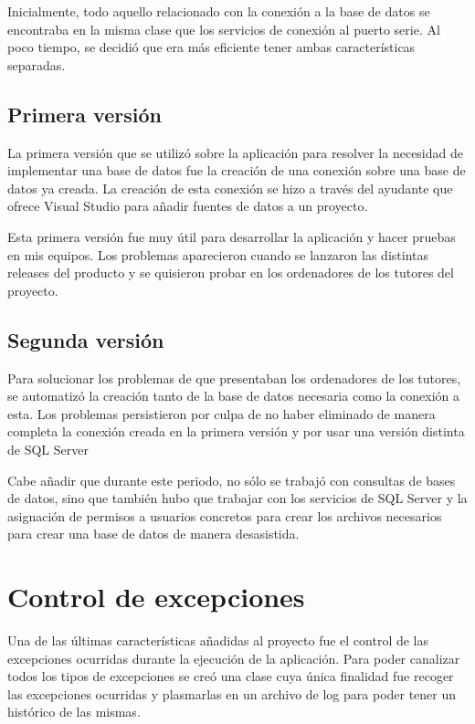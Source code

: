 Inicialmente, todo aquello relacionado con la conexión a la base de datos se encontraba en la misma clase que los servicios de conexión al puerto serie. Al poco tiempo, se decidió que era más eficiente tener ambas características separadas.

\subsection{Primera versión}

La primera versión que se utilizó sobre la aplicación para resolver la necesidad de implementar una base de datos fue la creación de una conexión sobre una base de datos ya creada. La creación de esta conexión se hizo a través del ayudante que ofrece Visual Studio para añadir fuentes de datos a un proyecto. 

Esta primera versión fue muy útil para desarrollar la aplicación y hacer pruebas en mis equipos. Los problemas aparecieron cuando se lanzaron las distintas releases del producto y se quisieron probar en los ordenadores de los tutores del proyecto.

\subsection{Segunda versión}

Para solucionar los problemas de que presentaban los ordenadores de los tutores, se automatizó la creación tanto de la base de datos necesaria como la conexión a esta. Los problemas persistieron por culpa de no haber eliminado de manera completa la conexión creada en la primera versión y por usar una versión distinta de SQL Server

Cabe añadir que durante este periodo, no sólo se trabajó con consultas de bases de datos, sino que también hubo que trabajar con los servicios de SQL Server y la asignación de permisos a usuarios concretos para crear los archivos necesarios para crear una base de datos de manera desasistida.

\section{Control de excepciones}

Una de las últimas características añadidas al proyecto fue el control de las excepciones ocurridas durante la ejecución de la aplicación. Para poder canalizar todos los tipos de excepciones se creó una clase cuya única finalidad fue recoger las excepciones ocurridas y plasmarlas en un archivo de log para poder tener un histórico de las mismas.

